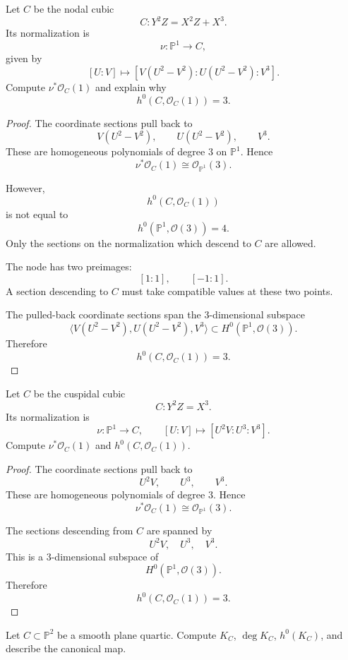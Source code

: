 \begin{exercise}
\label{exercise-nodal-cubic}
Let $C$ be the nodal cubic
$$
  C: Y^2Z=X^2Z+X^3.
$$
Its normalization is
$$
  \nu:\mathbb P^1\to C,
$$
given by
$$
  [U:V]\mapsto
  [V(U^2-V^2):U(U^2-V^2):V^3].
$$
Compute $\nu^*\mathcal O_C(1)$ and
explain why
$$
  h^0(C,\mathcal O_C(1))=3.
$$
\end{exercise}

\begin{proof}
The coordinate sections pull back to
$$
  V(U^2-V^2),
  \qquad
  U(U^2-V^2),
  \qquad
  V^3.
$$
These are homogeneous polynomials of
degree $3$ on $\mathbb P^1$. Hence
$$
  \nu^*\mathcal O_C(1)
  \cong
  \mathcal O_{\mathbb P^1}(3).
$$

However,
$$
  h^0(C,\mathcal O_C(1))
$$
is not equal to
$$
  h^0(\mathbb P^1,\mathcal O(3))=4.
$$
Only the sections on the normalization
which descend to $C$ are allowed.

The node has two preimages:
$$
  [1:1],
  \qquad
  [-1:1].
$$
A section descending to $C$ must take
compatible values at these two points.

The pulled-back coordinate sections span
the $3$-dimensional subspace
$$
  \langle
  V(U^2-V^2),
  U(U^2-V^2),
  V^3
  \rangle
  \subset
  H^0(\mathbb P^1,\mathcal O(3)).
$$
Therefore
$$
  h^0(C,\mathcal O_C(1))=3.
$$
\end{proof}

\begin{exercise}
\label{exercise-cuspidal-cubic}
Let $C$ be the cuspidal cubic
$$
  C: Y^2Z=X^3.
$$
Its normalization is
$$
  \nu:\mathbb P^1\to C,
  \qquad
  [U:V]\mapsto [U^2V:U^3:V^3].
$$
Compute $\nu^*\mathcal O_C(1)$ and
$h^0(C,\mathcal O_C(1))$.
\end{exercise}

\begin{proof}
The coordinate sections pull back to
$$
  U^2V,
  \qquad
  U^3,
  \qquad
  V^3.
$$
These are homogeneous polynomials of
degree $3$. Hence
$$
  \nu^*\mathcal O_C(1)
  \cong
  \mathcal O_{\mathbb P^1}(3).
$$

The sections descending from $C$ are
spanned by
$$
  U^2V,\quad U^3,\quad V^3.
$$
This is a $3$-dimensional subspace of
$$
  H^0(\mathbb P^1,\mathcal O(3)).
$$
Therefore
$$
  h^0(C,\mathcal O_C(1))=3.
$$
\end{proof}

\begin{exercise}
\label{exercise-plane-quartic-canonical}
Let $C\subset \mathbb P^2$ be a smooth
plane quartic. Compute $K_C$,
$\deg K_C$, $h^0(K_C)$, and describe the
canonical map.
\end{exercise}

